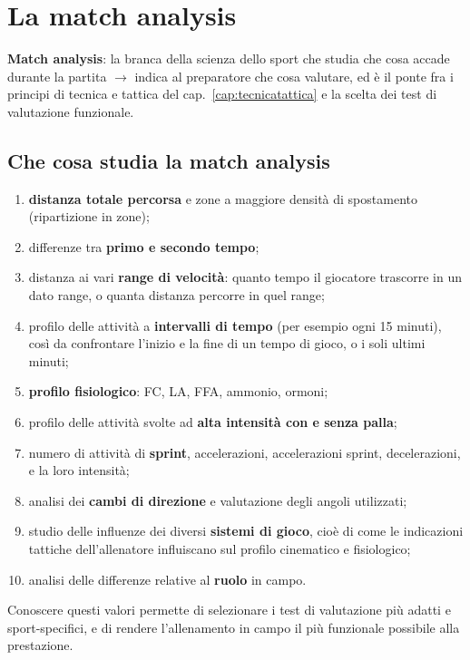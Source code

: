 \chapter{La match analysis}
\label{cap:matchanalysis}

\textbf{Match analysis}: la branca della scienza dello sport che studia che cosa accade durante la
partita $\rightarrow$ indica al preparatore che cosa valutare, ed è il ponte fra i principi di
tecnica e tattica del cap.~\ref{cap:tecnicatattica} e la scelta dei test di valutazione funzionale.

\section{Che cosa studia la match analysis}

\begin{enumerate}
  \item \textbf{distanza totale percorsa} e zone a maggiore densità di spostamento (ripartizione in
    zone);
  \item differenze tra \textbf{primo e secondo tempo};
  \item distanza ai vari \textbf{range di velocità}: quanto tempo il giocatore trascorre in un dato
    range, o quanta distanza percorre in quel range;
  \item profilo delle attività a \textbf{intervalli di tempo} (per esempio ogni 15 minuti), così da
    confrontare l'inizio e la fine di un tempo di gioco, o i soli ultimi minuti;
  \item \textbf{profilo fisiologico}: FC, LA, FFA, ammonio, ormoni;
  \item profilo delle attività svolte ad \textbf{alta intensità con e senza palla};
  \item numero di attività di \textbf{sprint}, accelerazioni, accelerazioni sprint, decelerazioni, e
    la loro intensità;
  \item analisi dei \textbf{cambi di direzione} e valutazione degli angoli utilizzati;
  \item studio delle influenze dei diversi \textbf{sistemi di gioco}, cioè di come le indicazioni
    tattiche dell'allenatore influiscano sul profilo cinematico e fisiologico;
  \item analisi delle differenze relative al \textbf{ruolo} in campo.
\end{enumerate}
Conoscere questi valori permette di selezionare i test di valutazione più adatti e sport-specifici,
e di rendere l'allenamento in campo il più funzionale possibile alla prestazione.

